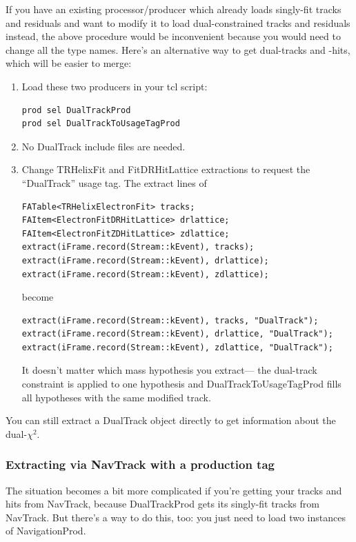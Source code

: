 \documentclass[12pt]{article}
\begin{document}
If you have an existing processor/producer which already loads
singly-fit tracks and residuals and want to modify it to load
dual-constrained tracks and residuals instead, the above procedure
would be inconvenient because you would need to change all the type
names.  Here's an alternative way to get dual-tracks and -hits, which
will be easier to merge:
\begin{enumerate}

  \item Load these two producers in your tcl script:
\begin{verbatim}prod sel DualTrackProd
prod sel DualTrackToUsageTagProd \end{verbatim}

  \item No DualTrack include files are needed.

  \item Change TRHelixFit and FitDRHitLattice extractions to request
  the ``DualTrack'' usage tag.  The extract lines of
\begin{verbatim}FATable<TRHelixElectronFit> tracks;
FAItem<ElectronFitDRHitLattice> drlattice;
FAItem<ElectronFitZDHitLattice> zdlattice;
extract(iFrame.record(Stream::kEvent), tracks);
extract(iFrame.record(Stream::kEvent), drlattice);
extract(iFrame.record(Stream::kEvent), zdlattice); \end{verbatim}
  become
\begin{verbatim}extract(iFrame.record(Stream::kEvent), tracks, "DualTrack");
extract(iFrame.record(Stream::kEvent), drlattice, "DualTrack");
extract(iFrame.record(Stream::kEvent), zdlattice, "DualTrack"); \end{verbatim}

  It doesn't matter which mass hypothesis you extract--- the
  dual-track constraint is applied to one hypothesis and
  DualTrackToUsageTagProd fills all hypotheses with the same modified track.

\end{enumerate}

You can still extract a DualTrack object directly to get information
about the dual-$\chi^2$.

\subsubsection{Extracting via NavTrack with a production tag}

The situation becomes a bit more complicated if you're getting your
tracks and hits from NavTrack, because DualTrackProd gets its
singly-fit tracks from NavTrack.  But there's a way to do this, too:
you just need to load two instances of NavigationProd.
\end{document}
